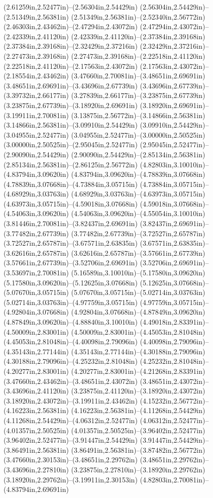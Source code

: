 (2.61259in,2.52477in)--(2.56304in,2.54429in) (2.56304in,2.54429in)--(2.51349in,2.56381in) (2.51349in,2.56381in)--(2.52340in,2.56772in) (2.46303in,2.43462in)--(2.47294in,2.43072in) (2.47294in,2.43072in)--(2.42339in,2.41120in) (2.42339in,2.41120in)--(2.37384in,2.39168in) (2.37384in,2.39168in)--(2.32429in,2.37216in) (2.32429in,2.37216in)--(2.27473in,2.39168in) (2.27473in,2.39168in)--(2.22518in,2.41120in) (2.22518in,2.41120in)--(2.17563in,2.43072in) (2.17563in,2.43072in)--(2.18554in,2.43462in) (3.47660in,2.70081in)--(3.48651in,2.69691in) (3.48651in,2.69691in)--(3.43696in,2.67739in) (3.43696in,2.67739in)--(3.39732in,2.66177in) (3.27839in,2.66177in)--(3.23875in,2.67739in) (3.23875in,2.67739in)--(3.18920in,2.69691in) (3.18920in,2.69691in)--(3.19911in,2.70081in) (3.13875in,2.56772in)--(3.14866in,2.56381in) (3.14866in,2.56381in)--(3.09910in,2.54429in) (3.09910in,2.54429in)--(3.04955in,2.52477in) (3.04955in,2.52477in)--(3.00000in,2.50525in) (3.00000in,2.50525in)--(2.95045in,2.52477in) (2.95045in,2.52477in)--(2.90090in,2.54429in) (2.90090in,2.54429in)--(2.85134in,2.56381in) (2.85134in,2.56381in)--(2.86125in,2.56772in) (4.82803in,3.10010in)--(4.83794in,3.09620in) (4.83794in,3.09620in)--(4.78839in,3.07668in) (4.78839in,3.07668in)--(4.73884in,3.05715in) (4.73884in,3.05715in)--(4.68929in,3.03763in) (4.68929in,3.03763in)--(4.63973in,3.05715in) (4.63973in,3.05715in)--(4.59018in,3.07668in) (4.59018in,3.07668in)--(4.54063in,3.09620in) (4.54063in,3.09620in)--(4.55054in,3.10010in) (3.81446in,2.70081in)--(3.82437in,2.69691in) (3.82437in,2.69691in)--(3.77482in,2.67739in) (3.77482in,2.67739in)--(3.72527in,2.65787in) (3.72527in,2.65787in)--(3.67571in,2.63835in) (3.67571in,2.63835in)--(3.62616in,2.65787in) (3.62616in,2.65787in)--(3.57661in,2.67739in) (3.57661in,2.67739in)--(3.52706in,2.69691in) (3.52706in,2.69691in)--(3.53697in,2.70081in) (5.16589in,3.10010in)--(5.17580in,3.09620in) (5.17580in,3.09620in)--(5.12625in,3.07668in) (5.12625in,3.07668in)--(5.07670in,3.05715in) (5.07670in,3.05715in)--(5.02714in,3.03763in) (5.02714in,3.03763in)--(4.97759in,3.05715in) (4.97759in,3.05715in)--(4.92804in,3.07668in) (4.92804in,3.07668in)--(4.87849in,3.09620in) (4.87849in,3.09620in)--(4.88840in,3.10010in) (4.49018in,2.83391in)--(4.50009in,2.83001in) (4.50009in,2.83001in)--(4.45053in,2.81048in) (4.45053in,2.81048in)--(4.40098in,2.79096in) (4.40098in,2.79096in)--(4.35143in,2.77144in) (4.35143in,2.77144in)--(4.30188in,2.79096in) (4.30188in,2.79096in)--(4.25232in,2.81048in) (4.25232in,2.81048in)--(4.20277in,2.83001in) (4.20277in,2.83001in)--(4.21268in,2.83391in) (3.47660in,2.43462in)--(3.48651in,2.43072in) (3.48651in,2.43072in)--(3.43696in,2.41120in) (3.23875in,2.41120in)--(3.18920in,2.43072in) (3.18920in,2.43072in)--(3.19911in,2.43462in) (4.15232in,2.56772in)--(4.16223in,2.56381in) (4.16223in,2.56381in)--(4.11268in,2.54429in) (4.11268in,2.54429in)--(4.06312in,2.52477in) (4.06312in,2.52477in)--(4.01357in,2.50525in) (4.01357in,2.50525in)--(3.96402in,2.52477in) (3.96402in,2.52477in)--(3.91447in,2.54429in) (3.91447in,2.54429in)--(3.86491in,2.56381in) (3.86491in,2.56381in)--(3.87482in,2.56772in) (3.47660in,2.30153in)--(3.48651in,2.29762in) (3.48651in,2.29762in)--(3.43696in,2.27810in) (3.23875in,2.27810in)--(3.18920in,2.29762in) (3.18920in,2.29762in)--(3.19911in,2.30153in) (4.82803in,2.70081in)--(4.83794in,2.69691in) 